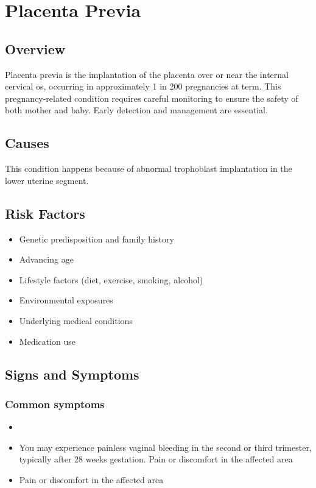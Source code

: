\chapter{Placenta Previa}
\label{sec:Placenta Previa}

\section{Overview}
Placenta previa is the implantation of the placenta over or near the internal cervical os, occurring in approximately 1 in 200 pregnancies at term. This pregnancy-related condition requires careful monitoring to ensure the safety of both mother and baby. Early detection and management are essential.
\section{Causes}
This condition happens because of abnormal trophoblast implantation in the lower uterine segment.     
\section{Risk Factors}

\begin{itemize}[noitemsep]
  \item Genetic predisposition and family history
  \item Advancing age
  \item Lifestyle factors (diet, exercise, smoking, alcohol)
  \item Environmental exposures
  \item Underlying medical conditions
  \item Medication use
\end{itemize}
\section{Signs and Symptoms}

\subsection{Common symptoms}
\begin{itemize}[noitemsep]
  \item \item You may experience painless vaginal bleeding in the second or third trimester, typically after 28 weeks gestation. Pain or discomfort in the affected area    \item Pain or discomfort in the affected area
  \end{itemize}


